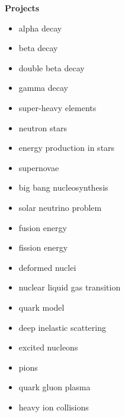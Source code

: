    
\pagestyle{plain}

\centerline{\bf\Large Projects}
\vspace*{0.5cm}

\begin{itemize}

\item alpha decay 

\item beta decay

\item double beta decay

\item gamma decay 

\item super-heavy elements

\item neutron stars

\item energy production in stars

\item supernovae

\item big bang nucleosynthesis

\item solar neutrino problem

\item fusion energy

\item fission energy

\item deformed nuclei

\item nuclear liquid gas transition

\item quark model

\item deep inelastic scattering 

\item excited nucleons

\item pions

\item quark gluon plasma

\item heavy ion collisions

\end{itemize}
 

   
 

 


  


